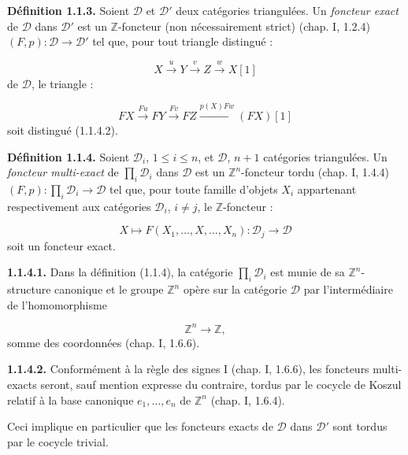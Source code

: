 %
\begingroup
\small
\setlength{\abovedisplayskip}{4pt plus 2pt minus 2pt}%
\setlength{\belowdisplayskip}{4pt plus 2pt minus 2pt}%

\noindent\textbf{Définition 1.1.3.}\quad
Soient $\mathcal D$ et $\mathcal D'$ deux catégories triangulées. Un
\emph{foncteur exact} de $\mathcal D$ dans $\mathcal D'$ est un
$\mathbb Z$-foncteur (non nécessairement strict) (chap. I, 1.2.4)
$(F,p)\colon\mathcal D\longrightarrow\mathcal D'$ tel que, pour tout
triangle distingué :

\[
  X\xrightarrow{u}Y\xrightarrow{v}Z\xrightarrow{w}X[1]
\]
de $\mathcal D$, le triangle :

\[
  FX\xrightarrow{Fu}FY\xrightarrow{Fv}FZ
  \xrightarrow{p(X)Fw}(FX)[1]
\]
soit distingué (1.1.4.2).

\medskip
\noindent\textbf{Définition 1.1.4.}\quad
Soient $\mathcal D_i$, $1\leq i\leq n$, et $\mathcal D$, $n+1$ catégories
triangulées. Un \emph{foncteur multi-exact} de $\prod_i\mathcal D_i$ dans
$\mathcal D$ est un $\mathbb Z^n$-foncteur tordu (chap. I, 1.4.4)
$(F,p)\colon\prod_i\mathcal D_i\longrightarrow\mathcal D$ tel que, pour
toute famille d'objets $X_i$ appartenant respectivement aux catégories
$\mathcal D_i$, $i\ne j$, le $\mathbb Z$-foncteur :

\[
  X\longmapsto F(X_1,\ldots,X,\ldots,X_n)\colon
  \mathcal D_j\longrightarrow\mathcal D
\]
soit un foncteur exact.

\medskip
\noindent\textbf{1.1.4.1.}\quad
Dans la définition (1.1.4), la catégorie $\prod_i\mathcal D_i$ est munie
de sa $\mathbb Z^n$-structure canonique et le groupe $\mathbb Z^n$ opère
sur la catégorie $\mathcal D$ par l'intermédiaire de l'homomorphisme

\[
  \mathbb Z^n\longrightarrow\mathbb Z,
\]
somme des coordonnées (chap. I, 1.6.6).

\medskip
\noindent\textbf{1.1.4.2.}\quad
Conformément à la règle des signes I (chap. I, 1.6.6), les foncteurs
multi-exacts seront, sauf mention expresse du contraire, tordus par le
cocycle de Koszul relatif à la base canonique $e_1,\ldots,e_n$ de
$\mathbb Z^n$ (chap. I, 1.6.4).

Ceci implique en particulier que les foncteurs exacts de $\mathcal D$
dans $\mathcal D'$ sont tordus par le cocycle trivial.

